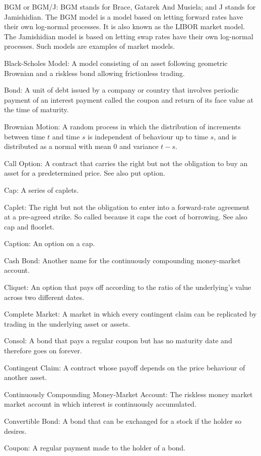 BGM or BGM/J: BGM stands for Brace, Gatarek And Musiela; and J stands for Jamishidian. The BGM model is a model based on letting forward rates have their own log-normal processes. It is also known as the LIBOR market model. The Jamishidian model is based on letting swap rates have their own log-normal processes. Such models are examples of market models.

Black-Scholes Model: A model consisting of an asset following geometric Brownian and a riskless bond allowing frictionless trading.

Bond: A unit of debt issued by a company or country that involves periodic payment of an interest payment called the coupon and return of its face value at the time of maturity.

Brownian Motion: A random process in which the distribution of increments between time $t$ and time $s$ is independent of behaviour up to time $s$, and is distributed as a normal with mean $0$ and variance $t-s$.

Call Option: A contract that carries the right but not the obligation to buy an asset for a predetermined price. See also put option.

Cap: A series of caplets.

Caplet: The right but not the obligation to enter into a forward-rate agreement at a pre-agreed strike. So called because it caps the cost of borrowing. See also cap and floorlet.

Caption: An option on a cap.

Cash Bond: Another name for the continuously compounding money-market account.

Cliquet: An option that pays off according to the ratio of the underlying's value across two different dates.

Complete Market: A market in which every contingent claim can be replicated by trading in the underlying asset or assets.

Consol: A bond that pays a regular coupon but has no maturity date and therefore goes on forever.

Contingent Claim: A contract whose payoff depends on the price behaviour of another asset.

Continuously Compounding Money-Market Account: The riskless money market market account in which interest is continuously accumulated.

Convertible Bond: A bond that can be exchanged for a stock if the holder so desires.

Coupon: A regular payment made to the holder of a bond.

